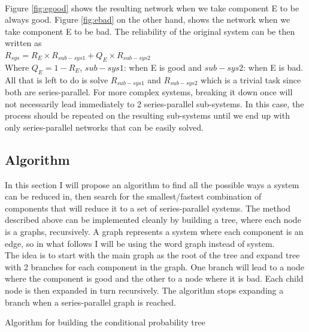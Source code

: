 \documentclass[conference]{IEEEtran}
\begin{document}
\\
Figure \ref{fig:egood} shows the resulting network when we take component E to
be always good. Figure \ref{fig:ebad} on the other hand, shows the network when
we take component E to be bad. The reliability of the original system can be
then written as\\
$R_{sys} = R_E \times R_{sub-sys1} + Q_E \times R_{sub-sys2}$\\
Where $Q_E = 1 - R_E$, $sub-sys1$: when E is good and $sub-sys2$: when E is bad.
All that is left to do is solve $R_{sub-sys1}$ and $R_{sub-sys2}$ which is a
trivial task since both are series-parallel. For more complex systems, breaking
it down once will not necessarily lead immediately to 2 series-parallel
sub-systems. In this case, the process should be repeated on the resulting
sub-systems until we end up with only series-parallel networks that can be
easily solved.
\subsection{Algorithm}
In this section I will propose an algorithm to find all the possible ways a
system can be reduced in, then search for the smallest/fastest combination of
components that will reduce it to a set of series-parallel systems. The method
described above can be implemented cleanly by building a tree, where each node
is a graphs, recursively. A graph represents a system where each component is an
edge, so in what follows I will be using the word graph instead of system.\\
The idea is to start with the main graph as the root of the tree and expand tree
with 2 branches for each component in the graph. One branch will lead to a node
where the component is good and the other to a node where it is bad. Each child
node is then expanded in turn recursively. The algorithm stops expanding a
branch when a series-parallel graph is reached.

\begin{algorithm}
\SetAlgoLined
{}

\BlankLine

\caption{Algorithm for building the conditional probability tree}
\label{alg:buildTree}
\end{algorithm}
\end{document}
